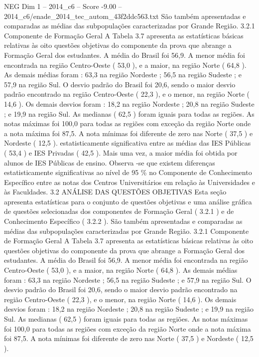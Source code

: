 \begin{textsample}{NEG Dim 1 – 2014\_c6 – Score -9.00 – 2014\_c6/enade\_2014\_tec\_autom\_43f2ddc563.txt}
São também apresentadas e comparadas as médias das subpopulações caracterizadas por Grande Região. 3.2.1 Componente de Formação Geral A Tabela 3.7 apresenta as estatísticas básicas relativas às oito questões objetivas do componente da prova que abrange a Formação Geral dos estudantes.
A média do Brasil foi 56,9.
A menor média foi encontrada na região Centro-Oeste ( 53,0 ), e a maior, na região Norte ( 64,8 ).
As demais médias foram : 63,3 na região Nordeste ; 56,5 na região Sudeste ; e 57,9 na região Sul.
O desvio padrão do Brasil foi 20,6, sendo o maior desvio padrão encontrado na região Centro-Oeste ( 22,3 ), e o menor, na região Norte ( 14,6 ).
Os demais desvios foram : 18,2 na região Nordeste ; 20,8 na região Sudeste ; e 19,9 na região Sul.
As medianas ( 62,5 ) foram iguais para todas as regiões.
As notas máximas foi 100,0 para todas as regiões com exceção da região Norte onde a nota máxima foi 87,5.
A nota mínimas foi diferente de zero nas Norte ( 37,5 ) e Nordeste ( 12,5 ). estatisticamente significativa entre as médias das IES Públicas ( 53,4 ) e IES Privadas ( 42,5 ).
Mais uma vez, a maior média foi obtida por alunos de IES Públicas de ensino.
Observa -se que existem diferenças estatisticamente significativas ao nível de 95 \% no Componente de Conhecimento Específico entre as notas dos Centros Universitários em relação às Universidades e às Faculdades. 3.2 ANÁLISE DAS QUESTÕES OBJETIVAS Esta seção apresenta estatísticas para o conjunto de questões objetivas e uma análise gráfica de questões selecionadas dos componentes de Formação Geral ( 3.2.1 ) e de Conhecimento Específico ( 3.2.2 ).
São também apresentadas e comparadas as médias das subpopulações caracterizadas por Grande Região. 3.2.1 Componente de Formação Geral A Tabela 3.7 apresenta as estatísticas básicas relativas às oito questões objetivas do componente da prova que abrange a Formação Geral dos estudantes.
A média do Brasil foi 56,9.
A menor média foi encontrada na região Centro-Oeste ( 53,0 ), e a maior, na região Norte ( 64,8 ).
As demais médias foram : 63,3 na região Nordeste ; 56,5 na região Sudeste ; e 57,9 na região Sul.
O desvio padrão do Brasil foi 20,6, sendo o maior desvio padrão encontrado na região Centro-Oeste ( 22,3 ), e o menor, na região Norte ( 14,6 ).
Os demais desvios foram : 18,2 na região Nordeste ; 20,8 na região Sudeste ; e 19,9 na região Sul.
As medianas ( 62,5 ) foram iguais para todas as regiões.
As notas máximas foi 100,0 para todas as regiões com exceção da região Norte onde a nota máxima foi 87,5.
A nota mínimas foi diferente de zero nas Norte ( 37,5 ) e Nordeste ( 12,5 ).

\end{textsample}
